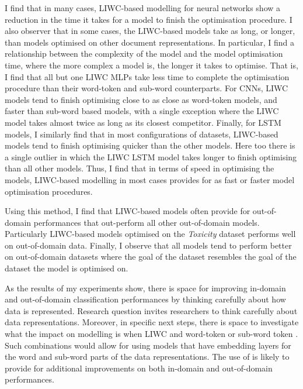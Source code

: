 I find that in many cases, LIWC-based modelling for neural networks show a reduction in the time it takes for a model to finish the optimisation procedure.
 I also observer that in some cases, the LIWC-based models take as long, or longer, than models optimised on other document representations.
In particular, I find  a relationship between the complexity of the model and the model optimisation time, where the more complex a model is, the longer it takes to optimise.
That is, I find that all but one LIWC MLPs take less time to complete the optimisation procedure than their word-token and sub-word counterparts.
For CNNs, LIWC models tend to finish optimising close to as close as word-token models, and faster than sub-word based models, with a single exception where the LIWC model takes almost twice as long as its closest competitor.
Finally, for LSTM models, I similarly find that in most configurations of datasets, LIWC-based models tend to finish optimising quicker than the other models.
Here too there is a single outlier in which the LIWC LSTM model takes longer to finish optimising than all other models.
Thus, I find that in terms of speed in optimising the models, LIWC-based modelling in most cases provides for as fast or faster model optimisation procedures.

Using this method, I find that LIWC-based models often provide for out-of-domain performances that out-perform all other out-of-domain models.
Particularly LIWC-based models optimised on the \textit{Toxicity} dataset performs well on out-of-domain data.
Finally, I observe that all models tend to perform better on out-of-domain datasets where the goal of the dataset resembles the goal of the dataset the model is optimised on.

As the results of my experiments show, there is space for improving in-domain and out-of-domain classification performances by thinking carefully about how data is represented.
Research question invites researchers to think carefully about data representations.
Moreover, in specific next steps, there is space to investigate what the impact on modelling is when  LIWC and word-token or sub-word token .
Such combinations would  allow for using models that have  embedding layers for the word and sub-word parts of the data representations.
The use of  is likely to provide for additional improvements on both in-domain and out-of-domain performances.


